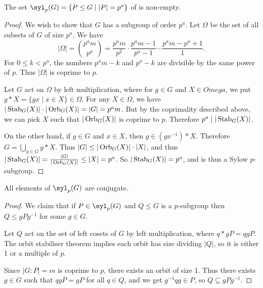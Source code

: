 \documentclass[a4paper]{scrartcl}
\begin{document}
\begin{theorem}
	The set $\syl_p(G) = \{P \leq G \mid |P| = p^a \}$ of  is non-empty.
\end{theorem}
\begin{proof}
	We wish to show that $G$ has a subgroup of order $p^a$.
	Let $\Omega$ be the set of all subsets of $G$ of size $p^a$.
	We have
	$$
	|\Omega| = \binom{p^a m}{p^a} = \frac{p^a m}{p^2} \cdot \frac{p^a m - 1}{p^a - 1} \cdots \frac{p^a m - p^a + 1}{1}.
	$$
	For $0 \leq k < p^a$, the numbers $p^am - k$ and $p^a  -k$ are divisible by the same power of $p$. Thus $|\Omega|$ is coprime to $p$.

	Let $G$ act on $\Omega$ by left multiplication, where for $g \in G
$ and $X \in Omega$, we put $g*X = \{gx \mid x \in X\} \in \Omega$. For any $X \in \Omega$, we have $|\operatorname{Stab}_G(X)| \cdot |\operatorname{Orb}_G(X)| = |G| = p^a m$. But by the coprimality described above, we can pick $X$ such that $|\operatorname{Orb}_G(X)|$ is coprime to $p$. Therefore $p^a \mid |\operatorname{Stab}_G(X)|$.

On the other hand, if $g \in G$ and $x \in X$, then $g \in (g x^{-1}) * X$. Therefore $G = \bigcup_{g \in G} g*X$. Thus $|G| \leq |\operatorname{Orb}_G(X)| \cdot |X|$, and thus $|\operatorname{Stab}_G(X)| = \frac{|G|}{|\operatorname{Orb}_G(X)|} \leq |X| = p^a$. So $|\operatorname{Stab}_G(X)| = p^a$, and is thus a Sylow $p$-subgroup.
\end{proof}

\begin{theorem}
	All elements of $\syl_p(G)$ are conjugate.
\end{theorem}
\begin{proof}
	We claim that if $P \in \syl_p(G)$ and $Q \leq G$ is a $p$-subgroup then $Q \leq gPg^{-1}$ for some $g \in G$.
	
	Let $Q$ act on the set of left cosets of $G$ by left multiplication, where $q * gP = qgP$. The orbit stabiliser theorem implies each orbit has size dividing $|Q|$, so it is either 1 or a multiple of $p$. 

	Since $|G:P| = m$ is coprime to $p$, there exists an orbit of size 1. Thus there exists $g \in G$ such that $qgP = gP$ for all $q \in Q$, and we get $g^{-1}q g \in P$, so $Q \subseteq gPg^{-1}$.
\end{proof}
\end{document}
